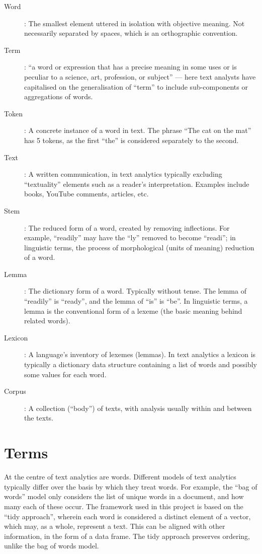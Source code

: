 \message{ !name(jason-cairns-dissertation.tex)}\documentclass[11pt, a4paper, titlepage]{report}
\begin{document}
\begin{description}
\item[\gls{Word}]: The smallest element uttered in isolation with
  objective meaning. Not necessarily separated by spaces, which is an
  orthographic convention.
\item[\gls{Term}]: ``a word or expression that has a precise
  meaning in some uses or is peculiar to a science, art, profession,
  or subject'' \autocite{dictionary:_term_defin_term} --- here text
  analysts have capitalised on the generalisation of ``term'' to
  include sub-components or aggregations of words.
\item[\gls{Token}]: A concrete instance of a word in text. The
  phrase ``The cat on the mat'' has 5 tokens, as the first ``the'' is
  considered separately to the second.
\item[\gls{Text}]: A written communication, in text
  analytics typically excluding ``textuality'' elements such as a reader's
  interpretation. Examples include books, YouTube comments, articles,
  etc.
\item[\gls{Stem}]: The reduced form of a word, created by removing
  inflections. For example, ``readily'' may have the ``ly'' removed to
  become ``readi''; in linguistic terms, the process of morphological
  (units of meaning) reduction of a word.
\item[\gls{Lemma}]: The dictionary form of a word. Typically
  without tense. The lemma of ``readily'' is ``ready'', and the lemma
  of ``is'' is ``be''. In linguistic terms, a lemma is the
  conventional form of a lexeme (the basic meaning behind related
  words).
\item[\gls{Lexicon}]: A language's inventory of lexemes
  (lemmas). In text analytics a lexicon is typically a
  dictionary data structure containing a list of words and possibly
  some values for each word.
\item[\gls{Corpus}]: A collection (``body'') of texts, with
  analysis usually within and between the texts.
\end{description}

\section{Terms}

At the centre of text analytics are words. Different models of text
analytics typically differ over the basis by which they treat words.
For example, the ``bag of words'' model only considers the list of
unique words in a document, and how many each of these occur. The
framework used in this project is based on the ``tidy approach'',
wherein each word is considered a distinct element of a vector, which
may, as a whole, represent a text. This can be aligned with other
information, in the form of a data frame. The tidy approach preserves
ordering, unlike the bag of words model.
\end{document}
